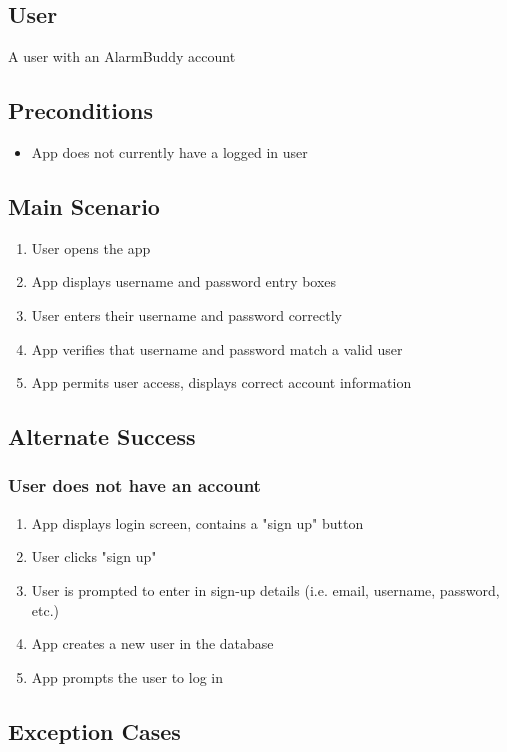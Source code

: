 \documentclass{article}
\begin{document}
	\subsection{User}
	A user with an AlarmBuddy account

	\subsection{Preconditions}
		\begin{itemize}
			\item App does not currently have a logged in user
		\end{itemize}

	\subsection{Main Scenario}
		\begin{enumerate}
			\item User opens the app
			\item App displays username and password entry boxes
			\item User enters their username and password correctly
			\item App verifies that username and password match a valid user
			\item App permits user access, displays correct account information
		\end{enumerate}

	\subsection{Alternate Success}
		\subsubsection{User does not have an account}
			\begin{enumerate}
				\item App displays login screen, contains a "sign up" button
				\item User clicks "sign up"
				\item User is prompted to enter in sign-up details (i.e. email, username, password, etc.)
				\item App creates a new user in the database
				\item App prompts the user to log in
			\end{enumerate}
	\subsection{Exception Cases}
\end{document}
